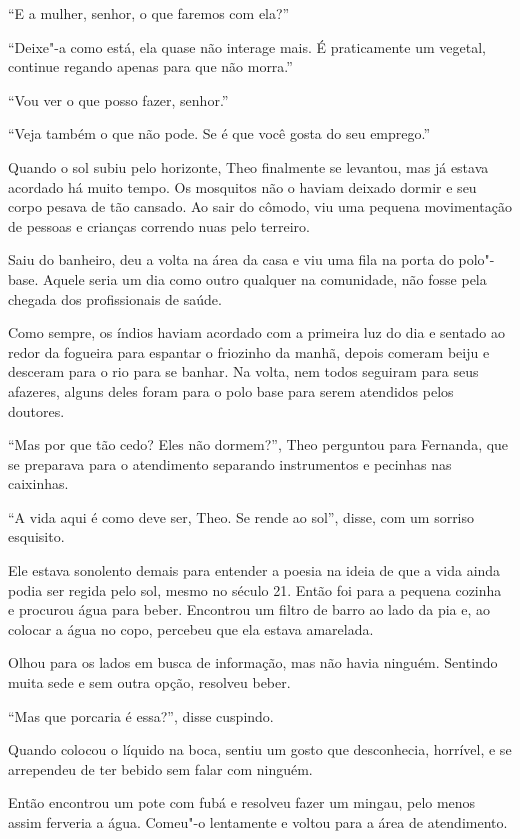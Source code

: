 ``E a mulher, senhor, o que faremos com ela?''

``Deixe"-a como está, ela quase não interage mais. É praticamente um
vegetal, continue regando apenas para que não morra.''

``Vou ver o que posso fazer, senhor.''

``Veja também o que não pode. Se é que você gosta do seu emprego.''

\asterisc


Quando o sol subiu pelo horizonte, Theo finalmente se levantou, mas já
estava acordado há muito tempo. Os mosquitos não o haviam deixado dormir
e seu corpo pesava de tão cansado. Ao sair do cômodo, viu uma pequena
movimentação de pessoas e crianças correndo nuas pelo terreiro.

Saiu do banheiro, deu a volta na área da casa e viu uma fila na
porta do polo"-base. Aquele seria um dia como outro qualquer na
comunidade, não fosse pela chegada dos profissionais de saúde.

Como sempre, os índios haviam acordado com a primeira luz do
dia e sentado ao redor da fogueira para espantar o friozinho da manhã,
depois comeram beiju e desceram para o rio para se banhar. Na volta, nem todos
seguiram para seus afazeres, alguns deles foram para o polo base para
serem atendidos pelos doutores.

``Mas por que tão cedo? Eles não dormem?'', Theo perguntou para
Fernanda, que se preparava para o atendimento separando instrumentos e
pecinhas nas caixinhas.

``A vida aqui é como deve ser, Theo. Se rende ao sol'', disse, com um
sorriso esquisito.

Ele estava sonolento demais para entender a poesia na ideia de que a
vida ainda podia ser regida pelo sol, mesmo no século 21. Então foi para
a pequena cozinha e procurou água para beber. Encontrou um filtro de barro
ao lado da pia e, ao colocar a água no copo, percebeu que ela estava
amarelada.

Olhou para os lados em busca de informação, mas não havia ninguém.
Sentindo muita sede e sem outra opção, resolveu beber.

``Mas que porcaria é essa?'', disse cuspindo.

Quando colocou o líquido na boca, sentiu um gosto que desconhecia,
horrível, e se arrependeu de ter bebido sem falar com ninguém.

Então encontrou um pote com fubá e resolveu fazer um mingau, pelo menos
assim ferveria a água. Comeu"-o lentamente e voltou para a área de
atendimento.

